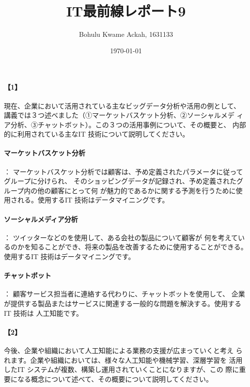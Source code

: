 \documentclass[20 pts]{article}
\title{IT最前線レポート9}
\author{Bohulu Kwame Ackah, 1631133}
\date{\today}
\begin{document}
\maketitle

\newpage
\paragraph{【1】}現在、企業において活用されている主なビッグデータ分析や活用の例として、
講義では３つ述べました（①マーケットバスケット分析、②ソーシャルメデ
ィア分析、③チャットボット）。この３つの活用事例について、その概要と、
内部的に利用されている主なIT 技術について説明してください。 \\
\paragraph{マーケットバスケット分析}：
マーケットバスケット分析では顧客は、予め定義されたパラメータに従ってグループに分けられ、
そのショッピングデータが記録され、予め定義されたグループ内の他の顧客にとって何
が魅力的であるかに関する予測を行うために使用される。使用するIT 技術はデータマイニングです。
\vspace{8mm}
\paragraph{ソーシャルメディア分析}：
ツイッターなどのを使用して、ある会社の製品について顧客が
何を考えているのかを知ることができ、将来の製品を改善するために使用することができる。
使用するIT 技術はデータマイニングです。
\vspace{8mm}　　　　　　　　　　
\paragraph{チャットボット}：
顧客サービス担当者に連絡する代わりに、チャットボットを使用して、
企業が提供する製品またはサービスに関連する一般的な問題を解決する。使用するIT 技術は
人工知能です。



\vspace{8mm}
\paragraph{【2】}今後、企業や組織において人工知能による業務の支援が広まっていくと考え
られます。企業や組織においては、様々な人工知能や機械学習、深層学習を
活用したIT システムが複数、構築し運用されていくことになりますが、この
際に重要になる概念について述べて、その概要について説明してください。\\
\end{document}
